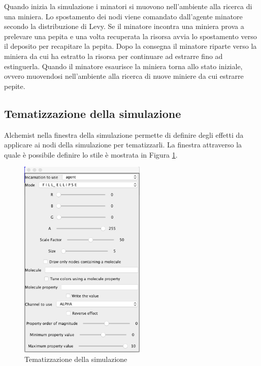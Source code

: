 Quando inizia la simulazione i minatori si muovono nell'ambiente alla ricerca di una miniera. Lo spostamento dei nodi viene comandato dall'agente minatore secondo la distribuzione di Levy.
Se il minatore incontra una miniera prova a prelevare una pepita e una volta recuperata la risorsa avvia lo spostamento verso il deposito per recapitare la pepita. Dopo la consegna il minatore riparte verso la miniera da cui ha estratto la risorsa per continuare ad estrarre fino ad estinguerla.
Quando il minatore esaurisce la miniera torna allo stato iniziale, ovvero muovendosi nell'ambiente alla ricerca di nuove miniere da cui estrarre pepite.


\subsection{Tematizzazione della simulazione}
Alchemist nella finestra della simulazione permette di definire degli effetti da applicare ai nodi della simulazione per tematizzarli. La finestra attraverso la quale è possibile definire lo stile è mostrata in Figura \ref{fig:tematizzazioneSimulazione}.

\begin{figure}[h] %
\begin{center} %
\includegraphics[width=6cm]{images/tematizzazioneSimulazione.png} %
\caption[Tematizzazione della simulazione]{Tematizzazione della simulazione} \label{fig:tematizzazioneSimulazione}
\end{center}
\end{figure}

